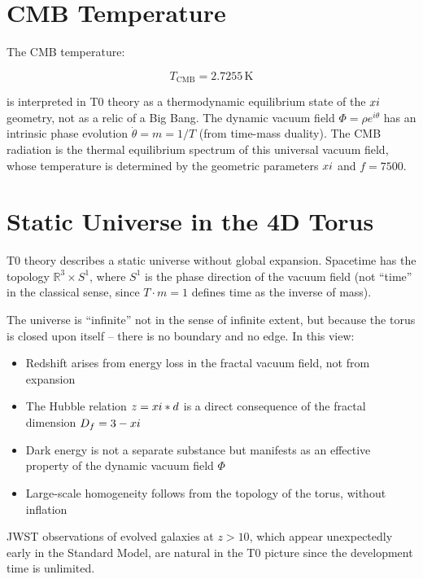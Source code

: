 \section{CMB Temperature}

The CMB temperature:

\begin{equation}
T_{\text{CMB}} = 2.7255\,\text{K}
\end{equation}

is interpreted in T0 theory as a thermodynamic equilibrium state of the 
$xi$ geometry, not as a relic of a Big Bang. The dynamic vacuum field 
$\Phi = \rho e^{i\theta}$ has an intrinsic phase evolution $\dot{\theta} = m 
= 1/T$ (from time-mass duality). The CMB radiation is the thermal equilibrium 
spectrum of this universal vacuum field, whose temperature is determined by the 
geometric parameters $xi$ and $f = 7500$.

\section{Static Universe in the 4D Torus}

T0 theory describes a static universe without global expansion. Spacetime 
has the topology $\mathbb{R}^3 \times S^1$, where $S^1$ is the phase 
direction of the vacuum field (not ``time'' in the classical sense, since 
$T \cdot m = 1$ defines time as the inverse of mass).

The universe is ``infinite'' not in the sense of infinite extent, but because 
the torus is closed upon itself -- there is no boundary and no edge. In this 
view:

\begin{itemize}
\item Redshift arises from energy loss in the fractal vacuum field, not from 
expansion
\item The Hubble relation $z = xi * d$ is a direct consequence of the 
fractal dimension $D_f = 3 - xi$
\item Dark energy is not a separate substance but manifests as an effective 
property of the dynamic vacuum field $\Phi$
\item Large-scale homogeneity follows from the topology of the torus, without 
inflation
\end{itemize}

JWST observations of evolved galaxies at $z > 10$, which appear unexpectedly 
early in the Standard Model, are natural in the T0 picture since the 
development time is unlimited.

